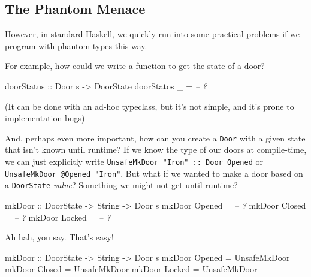\documentclass[]{article}
\newenvironment{Shaded}{}{}
\newcommand{\DataTypeTok}[1]{\textcolor[rgb]{0.56,0.13,0.00}{#1}}
\newcommand{\CommentTok}[1]{\textcolor[rgb]{0.38,0.63,0.69}{\textit{#1}}}
\newcommand{\OtherTok}[1]{\textcolor[rgb]{0.00,0.44,0.13}{#1}}
\newcommand{\FunctionTok}[1]{\textcolor[rgb]{0.02,0.16,0.49}{#1}}
\newcommand{\NormalTok}[1]{#1}
\begin{document}
\subsection{The Phantom Menace}\label{the-phantom-menace}

However, in standard Haskell, we quickly run into some practical problems if we
program with phantom types this way.

For example, how could we write a function to get the state of a door?

\begin{Shaded}
\begin{Highlighting}[]
\OtherTok{doorStatus ::} \DataTypeTok{Door}\NormalTok{ s }\OtherTok{->} \DataTypeTok{DoorState}
\NormalTok{doorStatos _ }\FunctionTok{=} \CommentTok{-- ?}
\end{Highlighting}
\end{Shaded}

(It can be done with an ad-hoc typeclass, but it's not simple, and it's prone to
implementation bugs)

And, perhaps even more important, how can you create a \texttt{Door} with a
given state that isn't known until runtime? If we know the type of our doors at
compile-time, we can just explicitly write
\texttt{UnsafeMkDoor\ "Iron"\ ::\ Door\ \textquotesingle{}Opened} or
\texttt{UnsafeMkDoor\ @\textquotesingle{}Opened\ "Iron"}. But what if we wanted
to make a door based on a \texttt{DoorState} \emph{value}? Something we might
not get until runtime?

\begin{Shaded}
\begin{Highlighting}[]
\OtherTok{mkDoor ::} \DataTypeTok{DoorState} \OtherTok{->} \DataTypeTok{String} \OtherTok{->} \DataTypeTok{Door}\NormalTok{ s}
\NormalTok{mkDoor }\DataTypeTok{Opened} \FunctionTok{=} \CommentTok{-- ?}
\NormalTok{mkDoor }\DataTypeTok{Closed} \FunctionTok{=} \CommentTok{-- ?}
\NormalTok{mkDoor }\DataTypeTok{Locked} \FunctionTok{=} \CommentTok{-- ?}
\end{Highlighting}
\end{Shaded}

Ah hah, you say. That's easy!

\begin{Shaded}
\begin{Highlighting}[]
\OtherTok{mkDoor ::} \DataTypeTok{DoorState} \OtherTok{->} \DataTypeTok{String} \OtherTok{->} \DataTypeTok{Door}\NormalTok{ s}
\NormalTok{mkDoor }\DataTypeTok{Opened} \FunctionTok{=} \DataTypeTok{UnsafeMkDoor}
\NormalTok{mkDoor }\DataTypeTok{Closed} \FunctionTok{=} \DataTypeTok{UnsafeMkDoor}
\NormalTok{mkDoor }\DataTypeTok{Locked} \FunctionTok{=} \DataTypeTok{UnsafeMkDoor}
\end{Highlighting}
\end{Shaded}
\end{document}
